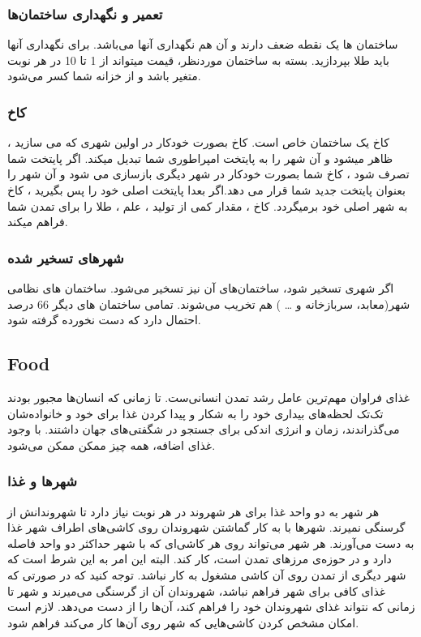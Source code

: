 \documentclass[]{article}
\begin{document}
\subsubsection*{{\titr تعمیر و نگهداری ساختمان‌ها}}
ساختمان ها یک نقطه ضعف دارند و آن هم نگهداری آنها می‌باشد. برای نگهداری آنها باید طلا بپردازید. بسته به ساختمان موردنظر‌، قیمت میتواند از 1 تا 10 در هر نوبت متغیر باشد و از خزانه شما کسر می‌شود.


\subsubsection*{{\titr کاخ}}
کاخ یک ساختمان خاص است. کاخ بصورت خودکار در اولین شهری که می سازید ، ظاهر میشود و آن شهر را به پایتخت امپراطوری شما تبدیل میکند. اگر پایتخت شما تصرف شود ، کاخ شما بصورت خودکار در شهر دیگری بازسازی می شود و آن شهر را بعنوان پایتخت جدید شما قرار می دهد.اگر بعدا پایتخت اصلی خود را پس بگیرید ، کاخ به شهر اصلی خود برمیگردد.
کاخ ، مقدار کمی از تولید ، علم ، طلا را برای تمدن شما فراهم میکند. 


\subsubsection*{{\titr شهرهای تسخیر شده}}
اگر شهری تسخیر شود، ساختمان‌های آن نیز تسخیر می‌شود. ساختمان های نظامی شهر(معابد، سربازخانه و … ) هم تخریب می‌شوند. تمامی ساختمان های دیگر 66 درصد احتمال دارد که دست نخورده گرفته شود.

\subsection*{{\titr Food}}
غذای فراوان مهم‌ترین عامل رشد تمدن انسانی‌ست. تا زمانی که انسان‌ها مجبور بودند تک‌تک لحظه‌های بیداری خود را به شکار و پیدا کردن غذا برای خود و خانواده‌شان می‌گذراندند، زمان و انرژی اندکی برای جستجو در شگفتی‌های جهان داشتند. با وجود غذای اضافه، همه چیز ممکن ممکن می‌شود.

\subsubsection*{{\titr شهرها و غذا
}}
هر شهر به دو واحد غذا برای هر شهروند در هر نوبت نیاز دارد تا شهروندانش از گرسنگی نمیرند. شهرها با به کار گماشتن شهروندان روی کاشی‌های اطراف شهر غذا به دست می‌آورند. هر شهر می‌تواند روی هر کاشی‌ای که با شهر حداکثر دو واحد فاصله دارد و در حوزه‌ی مرزهای تمدن است، کار کند. البته این امر به این شرط است که شهر دیگری از تمدن روی آن کاشی مشغول به کار نباشد.
توجه کنید که در صورتی که غذای کافی برای شهر فراهم نباشد، شهروندان آن از گرسنگی می‌میرند و شهر تا زمانی که نتواند غذای شهروندان خود را فراهم کند، آن‌ها را از دست می‌دهد.
لازم است امکان مشخص کردن کاشی‌هایی که شهر روی آن‌ها کار می‌کند فراهم شود.
\end{document}
